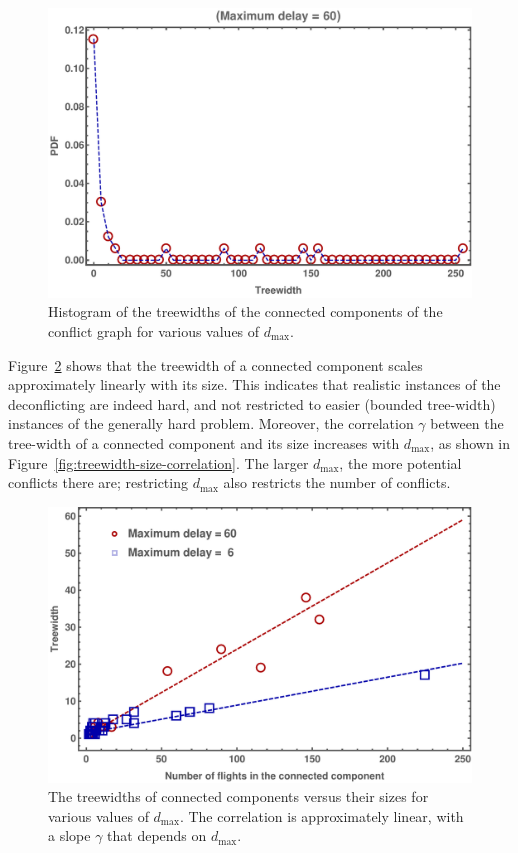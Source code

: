 \begin{figure}[h]
\includegraphics[width=\columnwidth]{pics/instances/treewidth_histogram.pdf}
\caption[Histogram of connected component treewidths]{Histogram of the treewidths of the connected components of the conflict graph for various values of $d_{\max}$.}
\label{fig:hist-tws}
\end{figure}

Figure~\ref{fig:tw-vs-CC-size} shows that the treewidth of a connected component scales approximately linearly with its size.
This indicates that realistic instances of the deconflicting are indeed hard, and not restricted to easier (bounded tree-width) instances of the generally hard problem.
Moreover, the correlation $\gamma$ between the tree-width of a connected component and its size increases with $d_{\max}$, as shown in Figure~\ref{fig:treewidth-size-correlation}.
The larger $d_{\max}$, the more potential conflicts there are;
restricting $d_{\max}$ also restricts the number of conflicts.

\begin{figure}[h]
\includegraphics[width=\columnwidth]{pics/instances/treewidth_connectivity.pdf}
\caption[Correlation between connected component size and treewidth]{
The treewidths of connected components versus their sizes for various values of $d_{\max}$.
The correlation is approximately linear, with a slope $\gamma$ that depends on $d_{\max}$.
}
\label{fig:tw-vs-CC-size}
\end{figure}

